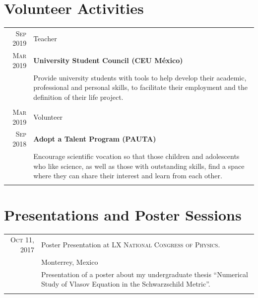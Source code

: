 \documentclass[a4paper,10pt]{article} %
\begin{document}
\section{Volunteer Activities}
\bigskip
\begin{tabular}{r|p{11cm}}

	
	
	\textsc{Sep 2019} & Teacher\\
	\textsc{Mar 2019} &\footnotesize{\textbf{University Student Council (CEU México)}}\\
	&\footnotesize{Provide university students with tools to help develop their academic, professional and personal skills, to facilitate their employment and the definition of their life project.}\\
	\multicolumn{2}{c}{} \\	
	

	\textsc{Mar 2019} & Volunteer\\
	\textsc{Sep 2018} &\footnotesize{\textbf{Adopt a Talent Program (PAUTA)}}\\
	&\footnotesize{Encourage scientific vocation so that those children and adolescents who like science, as well as those with outstanding skills, find a space where they can share their interest and learn from each other.}\\
	\multicolumn{2}{c}{} \\	
	

\end{tabular}


\section{Presentations and Poster Sessions}
\bigskip
\begin{tabular}{r|p{11cm}}
	
	\textsc{Oct 11, 2017} & Poster Presentation at \textsc{LX National Congress of Physics.}\\
	&\small Monterrey, Mexico\\
	&\footnotesize{Presentation of a poster about my undergraduate thesis ``Numerical Study of Vlasov Equation in the Schwarzschild Metric''.}\\
	\multicolumn{2}{c}{} \\
	
\end{tabular}
\end{document}
